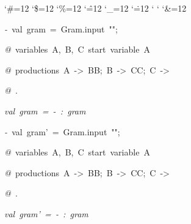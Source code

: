 \begin{list}{}
{\setlength{\leftmargin}{\leftmargini}
\setlength{\rightmargin}{0cm}
\setlength{\itemindent}{0cm}
\setlength{\listparindent}{0cm}
\setlength{\itemsep}{0cm}
\setlength{\parsep}{0cm}
\setlength{\labelsep}{0cm}
\setlength{\labelwidth}{0cm}
\catcode`\#=12
\catcode`\$=12
\catcode`\%=12
\catcode`\^=12
\catcode`\_=12
\catcode`\.=12
\catcode`
\catcode`
\catcode`\&=12
\ttfamily}
\small
\item[]\textsl{-\ }val\ gram\ =\ Gram.input\ "";
\item[]\textsl{@\ }variables\ A,\ B,\ C\ start\ variable\ A
\item[]\textsl{@\ }productions\ A\ ->\ BB;\ B\ ->\ CC;\ C\ ->\ %
\item[]\textsl{@\ }.
\item[]\textsl{val\ gram\ =\ -\ :\ gram}
\item[]\textsl{-\ }val\ gram'\ =\ Gram.input\ "";
\item[]\textsl{@\ }variables\ A,\ B,\ C\ start\ variable\ A
\item[]\textsl{@\ }productions\ A\ ->\ BB;\ B\ ->\ CC;\ C\ ->\ %
\item[]\textsl{@\ }.
\item[]\textsl{val\ gram'\ =\ -\ :\ gram}
\end{list}

